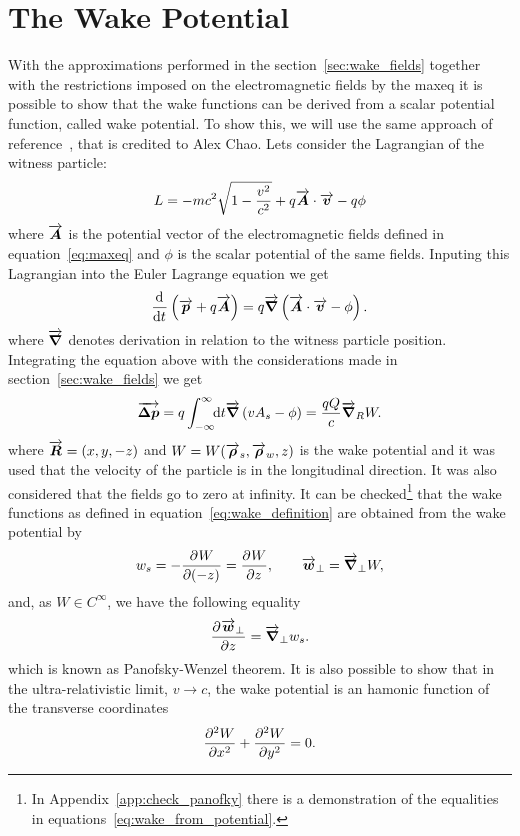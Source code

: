\section{The Wake Potential}

    With the approximations performed in the section~\ref{sec:wake_fields} together with the restrictions imposed on the electromagnetic fields by the \gls{maxeq} it is possible to show that the wake functions can be derived from a scalar potential function, called wake potential. To show this, we will use the same approach of reference~\cite{Stupakov2000a}, that is credited to Alex Chao. Lets consider the Lagrangian of the witness particle:
    \begin{align}
  	  	L = -mc^2\sqrt{1 - \frac{v^2}{c^2}} + q\vect{A}\cdot\vect{v} - q\phi
    \end{align}
    where $\vect{A}$ is the potential vector of the electromagnetic fields defined in equation~\eqref{eq:maxeq} and $\phi$ is the scalar potential of the same fields. Inputing this Lagrangian into the Euler Lagrange equation we get
    \begin{align}
	  	\dertot{}{t} \left(\vect{p} + q\vect{A}\right) = q\vect{\nabla}\left( \vect{A}\cdot\vect{v} - \phi\right).
    \end{align}
    where $\vect{\nabla}$ denotes derivation in relation to the witness particle position. Integrating the equation above with the considerations made in section~\ref{sec:wake_fields} we get
    \begin{align}
   		\vect{\Delta p} = q\infint{t}{\vect{\nabla}\left(vA_s - \phi \right)} = \frac{qQ}{c} \vect{\nabla}_R W.
    \end{align}
    where $\vect{R} =(x, y, -z)$ and $W = W(\vect{\rho}_s, \vect{\rho}_w, z)$ is the wake potential and it was used that the velocity of the particle is in the longitudinal direction. It was also considered that the fields go to zero at infinity. It can be checked\footnote{In Appendix~\ref{app:check_panofky} there is a demonstration of the equalities in equations~\eqref{eq:wake_from_potential}.} that the wake functions as defined in equation~\eqref{eq:wake_definition} are obtained from the wake potential by
    \begin{align}\label{eq:wake_from_potential}
   		w_s = - \derpar{W}{(-z)} = \derpar{W}{z},\qquad \vect{w}_\perp = \vect{\nabla}_\perp W,
    \end{align}
    and, as $W \in C^{\infty}$, we have the following equality
    \begin{align}\label{eq:panofsky_wenzel_theorem}
   		\derpar{\vect{w}_\perp}{z} = \vect{\nabla}_\perp w_s.
    \end{align}
    which is known as Panofsky-Wenzel theorem. It is also possible to show that in the ultra-relativistic limit, $v \to c$, the wake potential is an hamonic function of the transverse coordinates
    \begin{align}\label{eq:potential_harmonic}
  	  	\derpar[2]{W}{x} + \derpar[2]{W}{y} = 0.
    \end{align}

